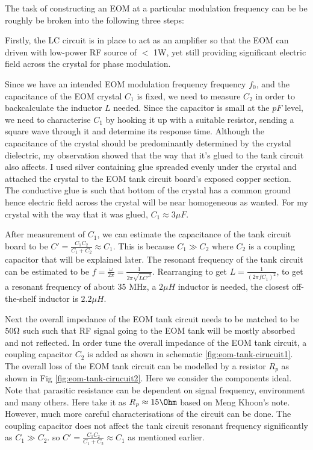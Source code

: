 \documentclass[12pt]{report}
\begin{document}
The task of constructing an EOM at a particular modulation frequency can be be roughly be broken into the following three steps:
\par
Firstly, the LC circuit is in place to act as an amplifier so that the EOM can driven with low-power RF source of $<$ 1W, yet still providing significant electric field across the crystal for phase modulation. 
\par
Since we have an intended EOM modulation frequency frequency $f_0$, and the capacitance of the EOM crystal $C_1$ is fixed, we need to measure $C_2$ in order to backcalculate the inductor $L$ needed. Since the capacitor is small at the $pF$ level, we need to characterise $C_1$ by hooking it up with a suitable resistor, sending a square wave through it and determine its response time. Although the capacitance of the crystal should be predominantly determined by the crystal dielectric, my observation showed that the way that it's glued to the tank circuit also affects. I used silver containing glue spreaded evenly under the crystal and attached the crystal to the EOM tank circuit board's exposed copper section. The conductive glue is such that bottom of the crystal has a common ground hence electric field across the crystal will be near homogeneous as wanted. For my crystal with the way that it was glued, $C_1 \approx 3 \mu F$.
\par
After measurement of $C_1$, we can estimate the capacitance of the tank circuit board to be $C' = \frac{C_1C_2}{C_1+C_2} \approx C_1$. This is because $C_1 \gg C_2$ where $C_2$ is a coupling capacitor that will be explained later. The resonant frequency of the tank circuit can be estimated to be $f = \frac{\omega}{2\pi} = \frac{1}{2\pi\sqrt{LC'^2}}$. Rearranging to get $L = \frac{1}{(2\pi f C_1)^2}$, to get a resonant frequency of about 35 MHz, a $2 \mu H$ inductor is needed, the closest off-the-shelf inductor is $2.2 \mu H$. 
\par
Next the overall impedance of the EOM tank circuit needs to be matched to be $50\ohm$ such such that RF signal going to the EOM tank will be mostly absorbed and not reflected. In order tune the overall impedance of the EOM tank circuit, a coupling capacitor $C_2$ is added as shown in schematic \ref{fig:eom-tank-cirucuit1}. The overall loss of the EOM tank circuit can be modelled by a resistor $R_p$ as shown in Fig \ref{fig:eom-tank-cirucuit2}. Here we consider the components ideal. Note that parasitic resistance can be dependent on signal frequency, environment and many others. Here take it as $ R_p \approx 15 \Ohm$ based on Meng Khoon's note. However, much more careful characterisations of the circuit can be done. The coupling capacitor does not affect the tank circuit resonant frequency significantly as $C_1 \gg C_2$. so $C' = \frac{C_1C_2}{C_1+C_2} \approx C_1$ as mentioned earlier.  
\end{document}
